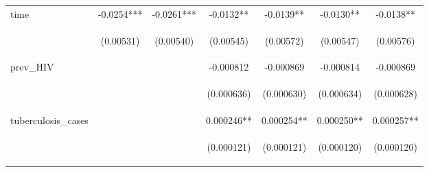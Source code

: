 \documentclass{article}
\begin{document}
\begin{table}[htbp]
{\begin{tabular}{lcccccc}
time & -0.0254*** & -0.0261*** & -0.0132** & -0.0139** & -0.0130** & -0.0138** \\
\vspace{4pt} & \begin{footnotesize}(0.00531)\end{footnotesize} & \begin{footnotesize}(0.00540)\end{footnotesize} & \begin{footnotesize}(0.00545)\end{footnotesize} & \begin{footnotesize}(0.00572)\end{footnotesize} & \begin{footnotesize}(0.00547)\end{footnotesize} & \begin{footnotesize}(0.00576)\end{footnotesize} \\
prev\_HIV &  &  & -0.000812 & -0.000869 & -0.000814 & -0.000869 \\
\vspace{4pt} & \begin{footnotesize}\end{footnotesize} & \begin{footnotesize}\end{footnotesize} & \begin{footnotesize}(0.000636)\end{footnotesize} & \begin{footnotesize}(0.000630)\end{footnotesize} & \begin{footnotesize}(0.000634)\end{footnotesize} & \begin{footnotesize}(0.000628)\end{footnotesize} \\
tuberculosis\_cases &  &  & 0.000246** & 0.000254** & 0.000250** & 0.000257** \\
\vspace{4pt} & \begin{footnotesize}\end{footnotesize} & \begin{footnotesize}\end{footnotesize} & \begin{footnotesize}(0.000121)\end{footnotesize} & \begin{footnotesize}(0.000121)\end{footnotesize} & \begin{footnotesize}(0.000120)\end{footnotesize} & \begin{footnotesize}(0.000120)\end{footnotesize} \\

\end{tabular}}
\end{table}
\end{document}
